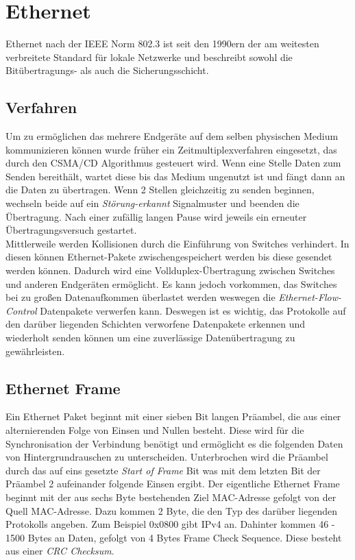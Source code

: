 \section{Ethernet}

Ethernet nach der IEEE Norm 802.3 ist seit den 1990ern der am weitesten verbreitete Standard für lokale Netzwerke und beschreibt sowohl die Bitübertragungs- als auch die Sicherungsschicht. \\
\subsection{Verfahren}
Um zu ermöglichen das mehrere Endgeräte auf dem selben physischen Medium kommunizieren können wurde früher ein Zeitmultiplexverfahren eingesetzt, das durch den CSMA/CD Algorithmus gesteuert wird. Wenn eine Stelle Daten zum Senden bereithält, wartet diese bis das Medium ungenutzt ist und fängt dann an die Daten zu übertragen. Wenn 2 Stellen gleichzeitig zu senden beginnen, wechseln beide auf ein \textit{Störung-erkannt} Signalmuster und beenden die Übertragung. Nach einer zufällig langen Pause wird jeweils ein erneuter Übertragungsversuch gestartet.\\
Mittlerweile werden Kollisionen durch die Einführung von Switches verhindert. In diesen können Ethernet-Pakete zwischengespeichert werden bis diese gesendet werden können. Dadurch wird eine Vollduplex-Übertragung zwischen Switches und anderen Endgeräten ermöglicht. Es kann jedoch vorkommen, das Switches bei zu großen Datenaufkommen überlastet werden weswegen die \textit{Ethernet-Flow-Control} Datenpakete verwerfen kann. Deswegen ist es wichtig, das Protokolle auf den darüber liegenden Schichten verworfene Datenpakete erkennen und wiederholt senden können um eine zuverlässige Datenübertragung zu gewährleisten. 

\subsection{Ethernet Frame}

Ein Ethernet Paket beginnt mit einer sieben Bit langen Präambel, die aus einer alternierenden Folge von Einsen und Nullen besteht. Diese wird für die Synchronisation der Verbindung benötigt und ermöglicht es die folgenden Daten von Hintergrundrauschen zu unterscheiden. Unterbrochen wird die Präambel durch das auf eins gesetzte \textit{Start of Frame} Bit was mit dem letzten Bit der Präambel 2 aufeinander folgende Einsen ergibt. 
Der eigentliche Ethernet Frame beginnt mit der aus sechs Byte bestehenden Ziel MAC-Adresse gefolgt von der Quell MAC-Adresse. 
Dazu kommen 2 Byte, die den Typ des darüber liegenden Protokolls angeben. Zum Beispiel 0x0800 gibt IPv4 an. Dahinter kommen 46 - 1500 Bytes an Daten, gefolgt von 4 Bytes Frame Check Sequence. Diese besteht aus einer  \textit{CRC Checksum}. 



